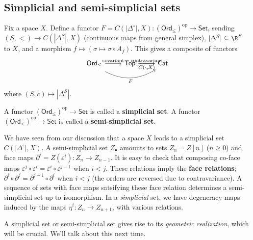 \subsection{Simplicial and semi-simplicial sets}
Fix a space $X$. Define a functor $F=C(|\Delta ^{\circ}|,X) \colon \left( \mathsf{Ord} _{\leq} \right)^{\mathrm{op}} \to \mathsf{Set}  $, sending $(S,<) \to C(|\Delta ^S|, X)$ (continuous maps from general simplex), $|\Delta ^S| \subseteq \R^S $ to $X$, and a morphism $f \mapsto  (\sigma \mapsto  \sigma \circ A_f)$. This gives a composite of functors \[
    \begin{tikzcd}
\mathsf{Ord}_{\leq} \arrow[r, "\text{covariant}"] \arrow[rr, "F"', bend right, shift right] & \mathsf{Top} \arrow[r, "\text{contravariant}"] \arrow[r, "{C(\cdot,X)}"'] & \mathsf{Cat}
\end{tikzcd}
\] where $(S,c) \mapsto |\Delta ^S|$.
\begin{definition}[]
    A functor $\left( \mathsf{Ord} _{\leq} \right) ^{\mathrm{op}}\to \mathsf{Set} $ is called a \textbf{simplicial set}. A functor $\left( \mathsf{Ord}_<  \right) ^{\mathrm{op}}\to \mathsf{Set} $ is called a \textbf{semi-simplicial set}.
\end{definition}
We have seen from our discussion that a space $X$ leads to a simplicial set $C( |\Delta ^{\circ }|, X)$. A semi-simplicial set $Z_{\bullet}$ amounts to sets $Z_n =Z[n]$ ($n\geq 0$) and face maps $\partial ^i  = Z(\varepsilon ^i ) \colon Z_n  \to Z_{n-1}$. It is easy to check that composing co-face maps $\varepsilon ^j  \circ \varepsilon ^i = \varepsilon ^i  \circ \varepsilon ^{j-1}$ when $i<j$. These relations imply the \textbf{face relations}; $\partial ^i  \circ \partial ^j = \partial ^{j-1}\circ \partial ^i $ when $i<j$ (the orders are reversed due to contravariance). A sequence of sets with face maps satsifying these face relation determines a semi-simplicial set up to isomorphism. In a \emph{simplicial} set, we have degeneracy maps induced by the maps $\eta ^i \colon Z_n  \to Z_{n+1}$, with various relations.

A simplicial set or semi-simplicial set gives rise to its \emph{geometric realization}, which will be crucial. We'll talk about this next time.


